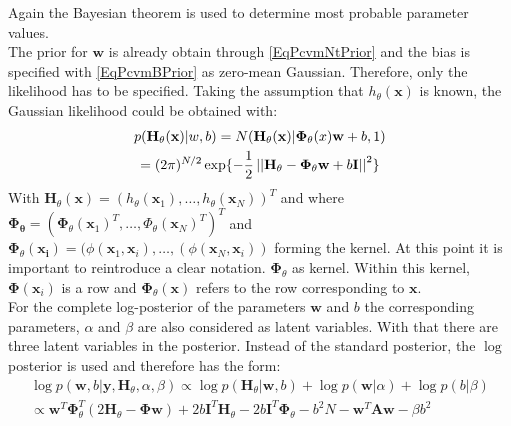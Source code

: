 Again the Bayesian theorem is used to determine most probable parameter values.\cite{Chen.2009}\\
The prior for $\mathbf{w}$ is already obtain through \eqref{EqPcvmNtPrior} and the bias is specified with \eqref{EqPcvmBPrior} as zero-mean Gaussian. Therefore, only the likelihood has to be specified.
Taking the assumption that $h_\theta (\mathbf{x})$ is known, the Gaussian likelihood could be obtained with:\cite{Chen.2009}
\begin{equation}\label{EqPcGausLike}
\begin{gathered}
p(\mathbf{H}_\theta(\mathbf{x})\vert w,b) = N(\mathbf{H}_\theta(\mathbf{x})\vert \mathbf{\Phi}_\theta(x)\mathbf{w}+b,1)\\
= (2\pi)^{N/2}\exp\{-\frac{1}{2} \left\vert\left\vert\mathbf{H}_{\theta} - \mathbf{\Phi}_{\theta}\mathbf{w}+b\mathbf{I}\right\vert\right\vert^2 \}
\end{gathered}
\end{equation}
With $\mathbf{H}_\theta(\mathbf{x}) = (h_\theta(\mathbf{x}_1),\dots,h_\theta(\mathbf{x}_N))^T$ and where $\mathbf{\Phi_\theta} = (\mathbf{\Phi}_\theta(\mathbf{x}_1)^T,\dots,\Phi_\theta(\mathbf{x}_N)^T)^T$ and $\mathbf{\Phi}_\theta(\mathbf{x_i}) = (\phi(\mathbf{x}_1,\mathbf{x}_i),\dots,(\phi(\mathbf{x}_N,\mathbf{x}_i))$ forming the kernel.
At this point it is important to reintroduce a clear notation.
$\mathbf{\Phi}_\theta$ as kernel. Within this kernel, $\mathbf{\Phi}(\mathbf{x}_i)$ is a row and $\mathbf{\Phi}_\theta(\mathbf{x})$ refers to the row corresponding to $\mathbf{x}$.\\
For the complete log-posterior of the parameters $\mathbf{w}$ and $b$ the corresponding parameters, $\alpha$ and $\beta$ are also considered as latent variables.
With that there are three latent variables in the posterior.
Instead of the standard posterior, the $\log$ posterior is used and therefore has the form:\cite{Chen.2009}
\begin{equation}\label{EqPcvmInf}
\begin{gathered}
\log p(\mathbf{w},b\vert \mathbf{y},\mathbf{H}_\theta,\alpha,\beta) \propto \log p(\mathbf{H}_\theta \vert \mathbf{w},b) + \log p(\mathbf{w}\vert \alpha) + \log p(b\vert \beta)\\
\propto \mathbf{w}^T\mathbf{\Phi}_\theta^T(2\mathbf{H}_\theta - \mathbf{\Phi}\mathbf{w})+2b\mathbf{I}^T\mathbf{H}_\theta - 2b\mathbf{I}^T\mathbf{\Phi}_\theta - b^2N - \mathbf{w}^T\mathbf{Aw}-\beta b^2
\end{gathered}
\end{equation}
